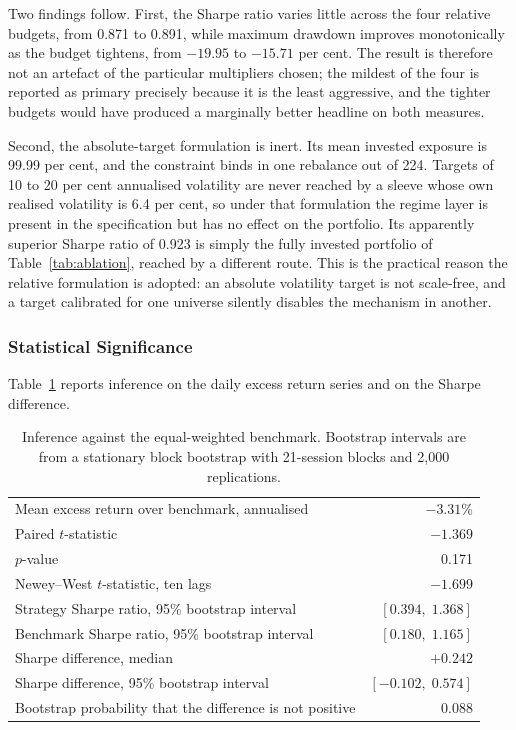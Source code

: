 \documentclass{singlecol-new}
\theoremstyle{TH}{
\newtheorem{lemma}{Lemma}
\newtheorem{theorem}[lemma]{Theorem}
\newtheorem{corrolary}[lemma]{Corrolary}
\newtheorem{conjecture}[lemma]{Conjecture}
\newtheorem{proposition}[lemma]{Proposition}
\newtheorem{claim}[lemma]{Claim}
\newtheorem{stheorem}[lemma]{Wrong Theorem}
\newtheorem{algorithm}{Algorithm}
}
\theoremstyle{THrm}{
\newtheorem{definition}{Definition}[section]
\newtheorem{question}{Question}[section]
\newtheorem{remark}{Remark}
\newtheorem{scheme}{Scheme}
}
\theoremstyle{THhit}{
\newtheorem{case}{Case}[section]
}
\begin{document}
Two findings follow. First, the Sharpe ratio varies little across the four relative
budgets, from 0.871 to 0.891, while maximum drawdown improves monotonically as the budget
tightens, from $-19.95$ to $-15.71$ per cent. The result is therefore not an artefact of
the particular multipliers chosen; the mildest of the four is reported as primary
precisely because it is the least aggressive, and the tighter budgets would have produced
a marginally better headline on both measures.

Second, the absolute-target formulation is inert. Its mean invested exposure is 99.99 per
cent, and the constraint binds in one rebalance out of 224. Targets of 10 to 20 per cent
annualised volatility are never reached by a sleeve whose own realised volatility is 6.4
per cent, so under that formulation the regime layer is present in the specification but
has no effect on the portfolio. Its apparently superior Sharpe ratio of 0.923 is simply
the fully invested portfolio of Table~\ref{tab:ablation}, reached by a different route.
This is the practical reason the relative formulation is adopted: an absolute volatility
target is not scale-free, and a target calibrated for one universe silently disables the
mechanism in another.

\subsubsection{Statistical Significance}

Table~\ref{tab:inference} reports inference on the daily excess return series and on the
Sharpe difference.

\begin{table}[!ht]
\centering
\caption{Inference against the equal-weighted benchmark. Bootstrap intervals are from a
stationary block bootstrap with 21-session blocks and 2{,}000 replications.}
\label{tab:inference}
\footnotesize
\begin{tabular}{p{6.4cm}r}
\hline
Mean excess return over benchmark, annualised & $-3.31$\% \\
Paired $t$-statistic & $-1.369$ \\
$p$-value & 0.171 \\
Newey--West $t$-statistic, ten lags & $-1.699$ \\
\hline
Strategy Sharpe ratio, 95\% bootstrap interval & $[0.394, \; 1.368]$ \\
Benchmark Sharpe ratio, 95\% bootstrap interval & $[0.180, \; 1.165]$ \\
Sharpe difference, median & $+0.242$ \\
Sharpe difference, 95\% bootstrap interval & $[-0.102, \; 0.574]$ \\
Bootstrap probability that the difference is not positive & 0.088 \\
\hline
\end{tabular}
\end{table}
\end{document}
